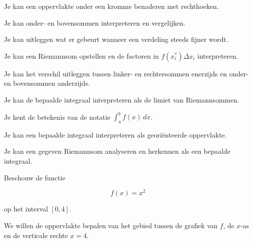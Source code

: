 \documentclass{ximera}
\begin{document}
\begin{leerdoelen}
    \item Je kan een oppervlakte onder een kromme benaderen met rechthoeken.
    \item Je kan onder- en bovensommen interpreteren en vergelijken.
    \item Je kan uitleggen wat er gebeurt wanneer een verdeling steeds fijner wordt.
    \item Je kan een Riemannsom opstellen en de factoren in
          \(f(x_i^\ast)\Delta x_i\) interpreteren.
    \item Je kan het verschil uitleggen tussen linker- en rechtersommen
          enerzijds en onder- en bovensommen anderzijds.
    \item Je kan de bepaalde integraal interpreteren als de limiet van Riemannsommen.
    \item Je kent de betekenis van de notatie
          \(\displaystyle\int_a^b f(x)\,dx\).
    \item Je kan een bepaalde integraal interpreteren als georiënteerde oppervlakte.
    \item Je kan een gegeven Riemannsom analyseren en herkennen als een bepaalde integraal.
\end{leerdoelen}




Beschouw de functie

\[
f(x)=x^2
\]

op het interval \([0,4]\).

We willen de oppervlakte bepalen van het gebied tussen de grafiek van
\(f\), de \(x\)-as en de verticale rechte \(x=4\).

\begin{center}
\end{center}
\end{document}
